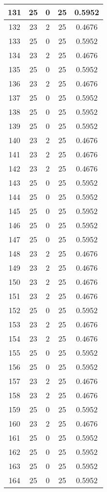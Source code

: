 \documentclass[letterpaper, 12pt]{article}
\begin{document}
\begin{longtable}{|c|c|c|c|c|}
\hline
131 & 25 & 0 & 25 & 0.5952 \\
\hline
132 & 23 & 2 & 25 & 0.4676 \\
\hline
133 & 25 & 0 & 25 & 0.5952 \\
\hline
134 & 23 & 2 & 25 & 0.4676 \\
\hline
135 & 25 & 0 & 25 & 0.5952 \\
\hline
136 & 23 & 2 & 25 & 0.4676 \\
\hline
137 & 25 & 0 & 25 & 0.5952 \\
\hline
138 & 25 & 0 & 25 & 0.5952 \\
\hline
139 & 25 & 0 & 25 & 0.5952 \\
\hline
140 & 23 & 2 & 25 & 0.4676 \\
\hline
141 & 23 & 2 & 25 & 0.4676 \\
\hline
142 & 23 & 2 & 25 & 0.4676 \\
\hline
143 & 25 & 0 & 25 & 0.5952 \\
\hline
144 & 25 & 0 & 25 & 0.5952 \\
\hline
145 & 25 & 0 & 25 & 0.5952 \\
\hline
146 & 25 & 0 & 25 & 0.5952 \\
\hline
147 & 25 & 0 & 25 & 0.5952 \\
\hline
148 & 23 & 2 & 25 & 0.4676 \\
\hline
149 & 23 & 2 & 25 & 0.4676 \\
\hline
150 & 23 & 2 & 25 & 0.4676 \\
\hline
151 & 23 & 2 & 25 & 0.4676 \\
\hline
152 & 25 & 0 & 25 & 0.5952 \\
\hline
153 & 23 & 2 & 25 & 0.4676 \\
\hline
154 & 23 & 2 & 25 & 0.4676 \\
\hline
155 & 25 & 0 & 25 & 0.5952 \\
\hline
156 & 25 & 0 & 25 & 0.5952 \\
\hline
157 & 23 & 2 & 25 & 0.4676 \\
\hline
158 & 23 & 2 & 25 & 0.4676 \\
\hline
159 & 25 & 0 & 25 & 0.5952 \\
\hline
160 & 23 & 2 & 25 & 0.4676 \\
\hline
161 & 25 & 0 & 25 & 0.5952 \\
\hline
162 & 25 & 0 & 25 & 0.5952 \\
\hline
163 & 25 & 0 & 25 & 0.5952 \\
\hline
164 & 25 & 0 & 25 & 0.5952 \\

\end{longtable}
\end{document}
